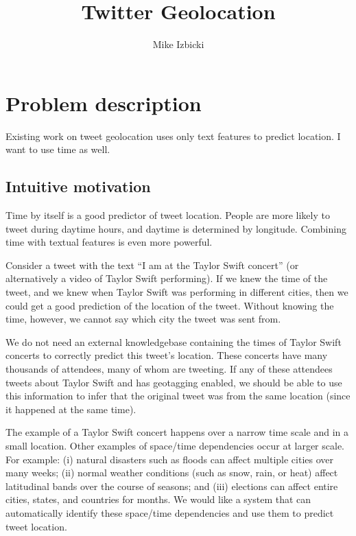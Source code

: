 \documentclass{article}
\title{Twitter Geolocation}
\author{Mike Izbicki}
\begin{document}
\maketitle


\section{Problem description}

Existing work on tweet geolocation uses only text features to predict location.
I want to use time as well.


\subsection{Intuitive motivation}

Time by itself is a good predictor of tweet location.
People are more likely to tweet during daytime hours,
and daytime is determined by longitude.
Combining time with textual features is even more powerful.

Consider a tweet with the text ``I am at the Taylor Swift concert''
(or alternatively a video of Taylor Swift performing).
If we knew the time of the tweet, 
and we knew when Taylor Swift was performing in different cities,
then we could get a good prediction of the location of the tweet.
Without knowing the time, however, we cannot say which city the tweet was sent from.

We do not need an external knowledgebase containing the times of Taylor Swift concerts to correctly predict this tweet's location.
These concerts have many thousands of attendees, many of whom are tweeting.
If any of these attendees tweets about Taylor Swift and has geotagging enabled,
we should be able to use this information to infer that the original tweet was from the same location
(since it happened at the same time).

The example of a Taylor Swift concert happens over a narrow time scale and in a small location.
Other examples of space/time dependencies occur at larger scale.
For example: 
(i) natural disasters such as floods can affect multiple cities over many weeks;
(ii) normal weather conditions (such as snow, rain, or heat) affect latitudinal bands over the course of seasons;
and (iii) elections can affect entire cities, states, and countries for months.
We would like a system that can automatically identify these space/time dependencies and use them to predict tweet location.
\end{document}
